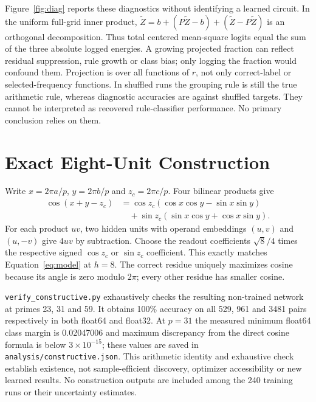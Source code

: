 \documentclass{article}
\begin{document}
Figure~\ref{fig:diag} reports these diagnostics without identifying a learned circuit. In the uniform full-grid inner product, $\widetilde Z=b+(P\widetilde Z-b)+(\widetilde Z-P\widetilde Z)$ is an orthogonal decomposition. Thus total centered mean-square logits equal the sum of the three absolute logged energies. A growing projected fraction can reflect residual suppression, rule growth or class bias; only logging the fraction would confound them. Projection is over all functions of $r$, not only correct-label or selected-frequency functions. In shuffled runs the grouping rule is still the true arithmetic rule, whereas diagnostic accuracies are against shuffled targets. They cannot be interpreted as recovered rule-classifier performance. No primary conclusion relies on them.

\section{Exact Eight-Unit Construction}\label{app:construction}
Write $x=2\pi a/p$, $y=2\pi b/p$ and $z_c=2\pi c/p$. Four bilinear products give
\begin{align*}
 \cos(x+y-z_c)
 &=\cos z_c(\cos x\cos y-\sin x\sin y)\\
 &\quad+\sin z_c(\sin x\cos y+\cos x\sin y).
\end{align*}
For each product $uv$, two hidden units with operand embeddings $(u,v)$ and $(u,-v)$ give $4uv$ by subtraction. Choose the readout coefficients $\sqrt8/4$ times the respective signed $\cos z_c$ or $\sin z_c$ coefficient. This exactly matches Equation~\ref{eq:model} at $h=8$. The correct residue uniquely maximizes cosine because its angle is zero modulo $2\pi$; every other residue has smaller cosine.

\texttt{verify\_constructive.py} exhaustively checks the resulting non-trained network at primes 23, 31 and 59. It obtains 100\% accuracy on all 529, 961 and 3481 pairs respectively in both float64 and float32. At $p=31$ the measured minimum float64 class margin is 0.02047006 and maximum discrepancy from the direct cosine formula is below $3\times10^{-15}$; these values are saved in \texttt{analysis/constructive.json}. This arithmetic identity and exhaustive check establish existence, not sample-efficient discovery, optimizer accessibility or new learned results. No construction outputs are included among the 240 training runs or their uncertainty estimates.
\end{document}
